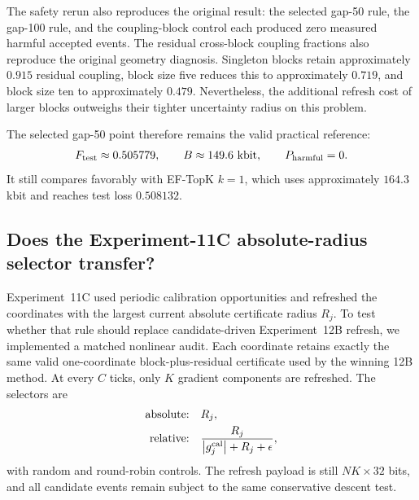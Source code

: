 The safety rerun also reproduces the original result: the selected gap-50 rule, the gap-100 rule, and the coupling-block control each produced zero measured harmful accepted events. The residual cross-block coupling fractions also reproduce the original geometry diagnosis. Singleton blocks retain approximately $0.915$ residual coupling, block size five reduces this to approximately $0.719$, and block size ten to approximately $0.479$. Nevertheless, the additional refresh cost of larger blocks outweighs their tighter uncertainty radius on this problem.

The selected gap-50 point therefore remains the valid practical reference:
\begin{equation}
  F_{\rm test}\approx0.505779,
  \qquad
  B\approx149.6\text{ kbit},
  \qquad
  P_{\rm harmful}=0.
\end{equation}
It still compares favorably with EF-TopK $k=1$, which uses approximately $164.3$ kbit and reaches test loss $0.508132$.

\subsection{Does the Experiment-11C absolute-radius selector transfer?}

Experiment~11C used periodic calibration opportunities and refreshed the coordinates with the largest current absolute certificate radius $R_j$. To test whether that rule should replace candidate-driven Experiment~12B refresh, we implemented a matched nonlinear audit. Each coordinate retains exactly the same valid one-coordinate block-plus-residual certificate used by the winning 12B method. At every $C$ ticks, only $K$ gradient components are refreshed. The selectors are
\begin{align}
  \text{absolute:}\quad &R_j,\\
  \text{relative:}\quad &\frac{R_j}{\left|g_j^{\rm cal}\right|+R_j+\epsilon},
\end{align}
with random and round-robin controls. The refresh payload is still $NK\times32$ bits, and all candidate events remain subject to the same conservative descent test.

